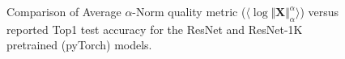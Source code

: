 \begin{figure}[t]
    \centering

    \qquad
    \caption{Comparison of Average $\alpha$-Norm quality metric ($\langle\log\Vert\mathbf{X}\Vert_{\alpha}^{\alpha}\rangle$) versus reported Top1 test accuracy for the ResNet and ResNet-1K pretrained (pyTorch) models. }
    \label{fig:cv2-accuracy}
\end{figure}


